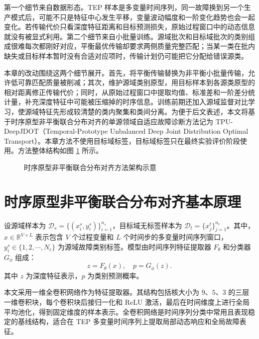 \documentclass{seuthesis-2022}
\begin{document}
第一个细节来自数据形态。TEP 样本是多变量时间序列，同一故障换到另一个生产模式后，可能不只是特征中心发生平移，变量波动幅度和一阶变化趋势也会一起变化。若传输代价只看深度特征距离和目标预测损失，原始过程窗口中的动态信息就没有被显式利用。第二个细节来自小批量训练。源域批次和目标域批次的类别组成很难每次都刚好对应，平衡最优传输却要求两侧质量完整匹配；当某一类在批内缺失或目标样本暂时没有合适对应项时，传输计划仍可能把它分配给错误源类。

本章的改动围绕这两个细节展开。首先，将平衡传输替换为非平衡小批量传输，允许低可靠匹配质量被削减；其次，维护源域类别原型，用目标样本到各源类原型的相对距离修正传输代价；同时，从原始过程窗口中提取均值、标准差和一阶差分统计量，补充深度特征中可能被压缩掉的时序信息。训练前期还加入源域监督对比学习，使源域特征先形成较清楚的类内聚集和类间分离。为便于后文表述，本文将基于时序原型非平衡联合分布对齐的单源领域自适应故障诊断方法记为 TPU-DeepJDOT（Temporal-Prototype Unbalanced Deep Joint Distribution Optimal Transport）。本章方法不使用目标域标签，目标域标签只在最终实验评价阶段使用。方法整体结构如图 \ref{fig:ch3_tpu_architecture} 所示。

\begin{figure}[!htbp]
    \centering
    \resizebox{\textwidth}{!}{\ignorespaces\unskip}
    \caption{时序原型非平衡联合分布对齐方法架构示意}
    \label{fig:ch3_tpu_architecture}
\end{figure}

\section{时序原型非平衡联合分布对齐基本原理}

设源域样本为 $\mathcal{D}_s=\{(x_i^s,y_i^s)\}_{i=1}^{n_s}$，目标域无标签样本为 $\mathcal{D}_t=\{x_j^t\}_{j=1}^{n_t}$。其中，$x\in\mathbb{R}^{V\times L}$ 表示包含 $V$ 个过程变量和 $L$ 个时间步的多变量时间序列窗口，$y_i^s\in\{1,2,\cdots,N_c\}$ 为源域故障类别标签。模型由时间序列特征提取器 $F_\theta$ 和分类器 $G_\phi$ 组成：
\begin{equation}
    z = F_\theta(x), \quad
    p = G_\phi(z).
\end{equation}
其中 $z$ 为深度特征表示，$p$ 为类别预测概率。

本文采用一维全卷积网络作为特征提取器。其结构包括核大小为 $9$、$5$、$3$ 的三层一维卷积块，每个卷积块后接归一化和 ReLU 激活，最后在时间维度上进行全局平均池化，得到固定维度的样本表示。全卷积网络是时间序列分类中常用且表现稳定的基线结构\cite{wang2017time,fawaz2019deep}，适合在 TEP 多变量时间序列上提取局部动态响应和全局故障表征。
\end{document}
